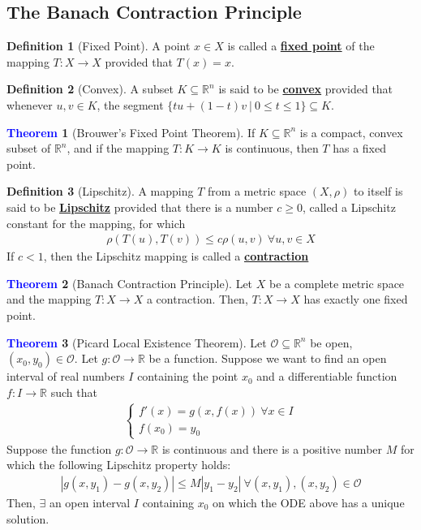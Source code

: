 \documentclass[11pt]{article}
\newcommand{\open}[0]{\mathcal{O}}
\theoremstyle{definition}
\theoremstyle{definition}
\newcommand{\R}[0]{\mathbb{R}}
\newcommand{\dfn}[1]{\underline{\textbf{#1}}}
\newtheorem{theorem}{\textcolor{blue}{Theorem}}
\theoremstyle{definition}
\newtheorem{definition}{\textcolor{OliveGreen}{Definition}}
\theoremstyle{remark}
\begin{document}
\subsection{The Banach Contraction Principle}

\begin{definition}[Fixed Point]
	A point $x \in X$ is called a \dfn{fixed point} of the mapping $T: X \rightarrow X$ provided that $T(x) = x$. 
\end{definition}

\begin{definition}[Convex]
	A subset $K \subseteq \R^n$ is said to be \dfn{convex} provided that whenever $u, v \in K$, the segment $\{ tu + (1-t) v\ |\ 0 \leq t \leq 1 \} \subseteq K$. 
\end{definition}

\begin{theorem}[Brouwer's Fixed Point Theorem]
	If $K \subseteq \R^n$ is a compact, convex subset of $\R^n$, and if the mapping $T: K \rightarrow K$ is continuous, then $T$ has a fixed point. 
\end{theorem}

\begin{definition}[Lipschitz] 
	A mapping $T$ from a metric space $(X, \rho)$ to itself is said to be \dfn{Lipschitz} provided that there is a number $c \geq 0$, called a Lipschitz constant for the mapping, for which 
	\begin{align}
		\rho(T(u), T(v) ) \leq c \rho (u,v)\ \forall u,v \in X	
	\end{align}
	If $c<1$, then the Lipschitz mapping is called a \dfn{contraction}
\end{definition}


\begin{theorem}[Banach Contraction Principle]
	Let $X$ be a complete metric space and the mapping $T: X \rightarrow X$ a contraction. Then, $T: X \rightarrow X$ has exactly one fixed point. 
\end{theorem}

\begin{theorem}[Picard Local Existence Theorem]
	Let $\open \subseteq \R^n$ be open, $(x_0, y_0) \in \open$. Let $g: \open \rightarrow \R$ be a function. Suppose we want to find an open interval of real numbers $I$ containing the point $x_0$ and a differentiable function $f: I \rightarrow \R$ such that
	\begin{align}
		\begin{cases}
			f'(x) = g(x, f(x))\ \forall x \in I \\
			f(x_0) = y_0 
		\end{cases}	
	\end{align}
	Suppose the function $g: \open \rightarrow \R$ is continuous and there is a positive number $M$ for which the following Lipschitz property holds: 
	\begin{align*}
		| g(x, y_1) - g(x, y_2) | \leq M |y_1 - y_2 |\ \forall (x, y_1), (x, y_2) \in \open
	\end{align*}
	Then, $\exists$ an open interval $I$ containing $x_0$ on which the ODE above has a unique solution. 
\end{theorem}
\end{document}
